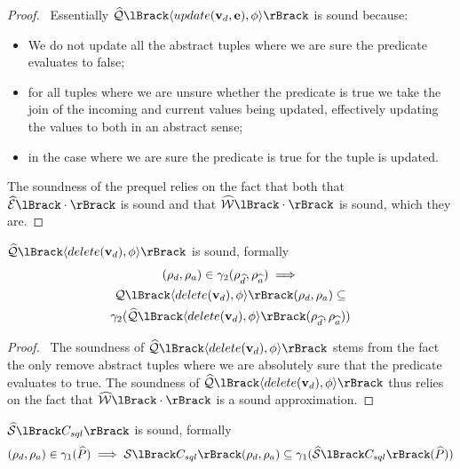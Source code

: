 \begin{proof}
    \pfsketch\
    Essentially $\abssqlsem{\langle update(\absattrs, \absexps), \abspred \rangle}$ is sound because:
    \begin{itemize}
        \item We do not update all the abstract tuples where we are sure the predicate evaluates to false;
        \item for all tuples where we are unsure whether the predicate is true we take the join of the incoming and current values being updated, effectively updating the values to both in an abstract sense;
        \item in the case where we are sure the predicate is true for the tuple is updated.
    \end{itemize}
    The soundness of the prequel relies on the fact that both that $\absexpsem{\cdot}$ is sound and that $\abspredsem{\cdot}$ is sound, which they are.
\end{proof}


\begin{conjecture}
    \label{thm:sound-delete}
    $\abssqlsem{\langle delete(\absattrs), \abspred \rangle}$ is sound, formally
    \begin{multline*}
    (\rho_d, \rho_a)
        \in \concrete_2(\rho_{\ab{d}}, \rho_{\ab{a}}) \implies \\
        \sqlsem{\langle delete(\absattrs), \abspred \rangle}(\rho_d, \rho_a) \subseteq \\
        \concrete_2(\abssqlsem{\langle delete(\absattrs), \abspred \rangle}(\rho_{\ab{d}}, \rho_{\ab{a}}))
    \end{multline*}
\end{conjecture}


\begin{proof}
    \pfsketch\
    The soundness of $\abssqlsem{\langle delete(\absattrs), \abspred \rangle}$ stems from the fact the only remove abstract tuples where we are absolutely sure that the predicate evaluates to true.
    The soundness of $\abssqlsem{\langle delete(\absattrs), \abspred \rangle}$ thus relies on the fact that $\abspredsem{\cdot}$ is a sound approximation.
\end{proof}


\begin{conjecture}
    \label{thm:sound-sql}
    $\abssem{C_{sql}}$ is sound, formally
    \begin{equation*}
    (\rho_d, \rho_a)
        \in \concrete_1(\ab{P}) \implies \sem{C_{sql}}(\rho_d, \rho_a) \subseteq \concrete_1(\abssem{C_{sql}}(\ab{P}))
    \end{equation*}
\end{conjecture}



